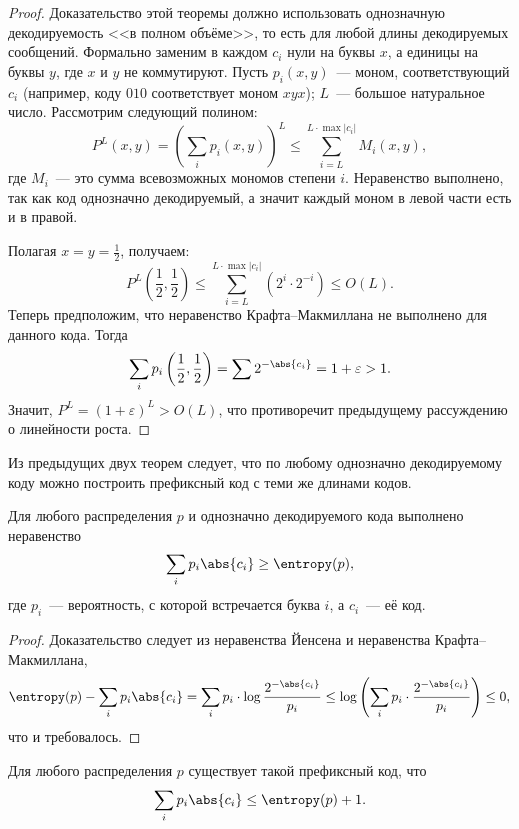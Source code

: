 \begin{proof}
    Доказательство этой теоремы должно использовать однозначную декодируемость <<в полном объёме>>, то
    есть для любой длины декодируемых сообщений. Формально заменим в каждом $c_i$ нули на буквы $x$, а
    единицы на буквы $y$, где $x$ и $y$ не коммутируют. Пусть $p_i(x, y)$~--- моном, соответствующий
    $c_i$ (например, коду $010$ соответствует моном $xyx$); $L$~--- большое натуральное число. Рассмотрим
    следующий полином:
    $$
        P^L(x, y) = \left(\sum_{i} p_i(x, y) \right)^L \le \sum_{i = L}^{L \cdot \max |c_i|} M_{i}(x, y),
    $$
    где $M_i$~--- это сумма всевозможных мономов степени $i$. Неравенство выполнено, так как код
    однозначно декодируемый, а значит каждый моном в левой части есть и в правой.

    Полагая $x = y = \frac{1}{2}$, получаем:
    $$
        P^L\left(\frac{1}{2},\frac{1}{2}\right) \le \sum_{i = L}^{L \cdot \max |c_i|}(2^i \cdot 2^{-i})
        \le O(L).
    $$
    Теперь предположим, что неравенство Крафта--Макмиллана не выполнено для данного кода. Тогда 
    $$
        \sum_i p_i\left(\frac{1}{2},\frac{1}{2}\right) = \sum 2^{-\abs{c_i}} = 1 + \varepsilon > 1.
    $$
    Значит, $P^L = (1 + \varepsilon)^{L} > O(L)$, что противоречит предыдущему рассуждению о линейности
    роста.
\end{proof}

Из предыдущих двух теорем следует, что по любому однозначно декодируемому коду можно построить префиксный
код с теми же длинами кодов.

\begin{theorem}[Шеннон]
    Для любого распределения $p$ и однозначно декодируемого кода выполнено неравенство
    $$
        \sum_i p_i\abs{c_i} \ge \entropy(p),
    $$
    где $p_i$~--- вероятность, с которой встречается буква $i$, а $c_i$~--- её код. 
\end{theorem}

\begin{proof}
    Доказательство следует из неравенства Йенсена и неравенства Крафта--Макмиллана, 
    $$
        \entropy(p) - \sum_i p_i\abs{c_i} = \sum_i p_i \cdot \log\frac{2^{-\abs{c_i}}}{p_i}
            \le \log\left(\sum_i p_i \cdot \frac{2^{-\abs{c_i}}}{p_i} \right) \le 0,
    $$
    что и требовалось.
\end{proof}

\begin{theorem}
    \label{th:prefix-code}
    Для любого распределения $p$ существует такой префиксный код, что
    $$
        \sum_i p_i\abs{c_i} \le \entropy(p) + 1.
    $$
\end{theorem}

